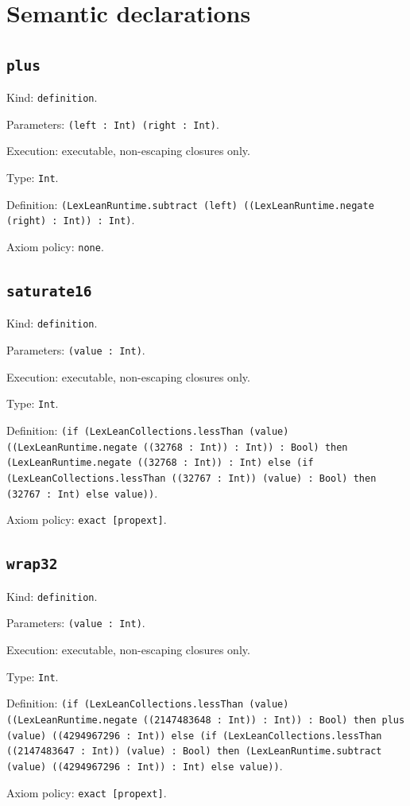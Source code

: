 \documentclass[11pt]{article}
\begin{document}
\section*{Semantic declarations}
\subsection*{\texttt{plus}}
\noindent Kind: \texttt{definition}.\par
\noindent Parameters: \texttt{(left : Int) (right : Int)}.\par
\noindent Execution: executable, non-escaping closures only.\par
\noindent Type: \texttt{Int}.\par
\noindent Definition: \texttt{(LexLeanRuntime.subtract (left) ((LexLeanRuntime.negate (right) : Int)) : Int)}.\par
\noindent Axiom policy: \texttt{none}.\par
\subsection*{\texttt{saturate16}}
\noindent Kind: \texttt{definition}.\par
\noindent Parameters: \texttt{(value : Int)}.\par
\noindent Execution: executable, non-escaping closures only.\par
\noindent Type: \texttt{Int}.\par
\noindent Definition: \texttt{(if (LexLeanCollections.lessThan (value) ((LexLeanRuntime.negate ((32768 : Int)) : Int)) : Bool) then (LexLeanRuntime.negate ((32768 : Int)) : Int) else (if (LexLeanCollections.lessThan ((32767 : Int)) (value) : Bool) then (32767 : Int) else value))}.\par
\noindent Axiom policy: \texttt{exact [propext]}.\par
\subsection*{\texttt{wrap32}}
\noindent Kind: \texttt{definition}.\par
\noindent Parameters: \texttt{(value : Int)}.\par
\noindent Execution: executable, non-escaping closures only.\par
\noindent Type: \texttt{Int}.\par
\noindent Definition: \texttt{(if (LexLeanCollections.lessThan (value) ((LexLeanRuntime.negate ((2147483648 : Int)) : Int)) : Bool) then plus (value) ((4294967296 : Int)) else (if (LexLeanCollections.lessThan ((2147483647 : Int)) (value) : Bool) then (LexLeanRuntime.subtract (value) ((4294967296 : Int)) : Int) else value))}.\par
\noindent Axiom policy: \texttt{exact [propext]}.\par
\end{document}
